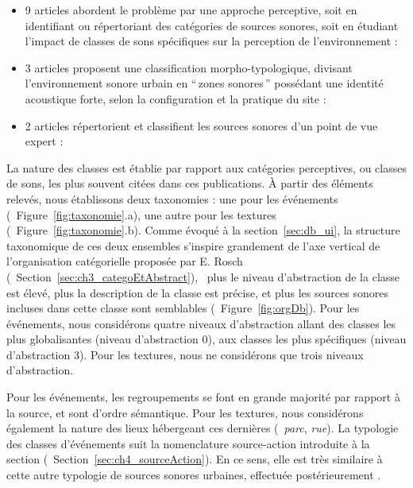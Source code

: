 \begin{itemize}
\item 9 articles abordent le problème par une approche perceptive, soit en identifiant ou répertoriant des catégories de sources sonores, soit en étudiant l'impact de classes de sons spécifiques sur la perception de l'environnement : \cite{maffiolo_caracterisation_1999,raimbault2002simulation,guastavino_etude_2003,defreville2004aactivity,raimbault2005urban,dubois2006cognitive,devergie_relations_2006,guastavino2006ideal,niessen2010categories}
\item 3 articles proposent une classification morpho-typologique, divisant l’environnement sonore urbain en ``\,zones sonores\,'' possédant une identité acoustique forte, selon la configuration et la pratique du site : \cite{maffiolo_caracterisation_1999,beaumont2004pertinence,polack2008perceptive}
\item 2 articles répertorient et classifient les sources sonores d’un point de vue expert : \cite{leobon_analyse_1986,brown2011towards}
\end{itemize}

La nature des classes est établie par rapport aux catégories perceptives, ou classes de sons, les plus souvent citées dans ces publications. À partir des éléments relevés, nous établissons deux taxonomies : une pour les événements (\cf~Figure~\ref{fig:taxonomie}.a), une autre pour les textures (\cf~Figure~\ref{fig:taxonomie}.b). Comme évoqué à la section~\ref{sec:db_ui}, la structure taxonomique de ces deux ensembles s'inspire grandement de l'axe vertical de l'organisation catégorielle proposée par E. Rosch (\cf~Section~\ref{sec:ch3_categoEtAbstract}), \ie~plus le niveau d'abstraction de la classe est élevé, plus la description de la classe est précise, et plus les sources sonores incluses dans cette classe sont semblables (\cf~Figure~\ref{fig:orgDb}). Pour les événements, nous considérons quatre niveaux d'abstraction allant des classes les plus globalisantes (niveau d'abstraction 0), aux classes les plus spécifiques (niveau d'abstraction 3). Pour les textures, nous ne considérons que trois niveaux d'abstraction.

Pour les événements, les regroupements se font en grande majorité par rapport à la source, et sont d’ordre sémantique. Pour les textures, nous considérons également la nature des lieux hébergeant ces dernières (\eg~\emph{parc}, \emph{rue}). La typologie des classes d'événements suit la nomenclature source-action introduite à la section (\cf~Section~\ref{sec:ch4_sourceAction}). En ce sens, elle est très similaire à cette autre typologie de sources sonores urbaines, effectuée postérieurement \citep{Salamon14}.

